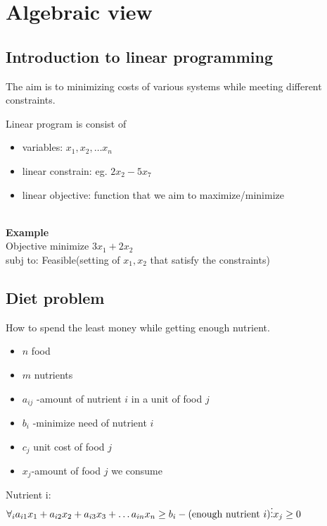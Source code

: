 \documentclass[12pt]{article}
\begin{document}
\MakeScribeTop

\section{Algebraic view}
\newcommand{\expected}{\mathbb{E}}
\newcommand{\probab}{\mathbb{P}}

\subsection{Introduction to linear programming}
The aim is to minimizing  costs of various systems while meeting different constraints.

Linear program is consist of 
\begin{itemize}
	\item  variables: $x_1,x_2,\dots x_n$
	
	\item linear constrain: eg. $2x_2-5x_7$ 
	
	\item linear objective: function that we aim to maximize/minimize
\end{itemize}
\\
\textbf{Example}\\
  Objective minimize $3x_1+2x_2$\\
  subj to:
Feasible(setting of $x_1,x_2$ that satisfy the constraints)
\subsection{Diet problem}
How to spend the least money while getting enough nutrient.
\begin{itemize}
	\item $n$ food
	\item $m$ nutrients 
	\item $a_{ij}$ -amount of nutrient $i$ in a unit of food $j$
	\item $b_i$ -minimize need of nutrient $i$
	\item $c_j$ unit cost of food $j$
	\item   $x_j$-amount of food $j$ we consume
\end{itemize}
 Nutrient i:\\
  $\forall _i a_{i1}x_1+a_{i2}x_2+a_{i3}x_3+\dots a_{in}x_n \geq b_i -(\text{enough nutrient }i)\\
\vdots\\
x_j \geq 0$\\
\end{document}

